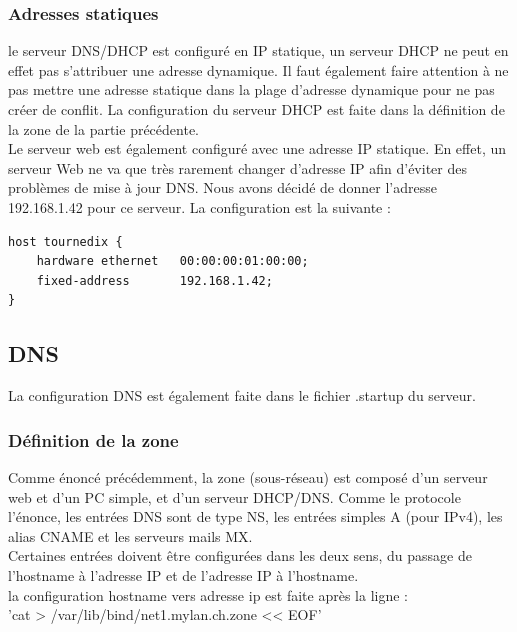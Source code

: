 \documentclass{article}
\begin{document}
\subsubsection{Adresses statiques}

le serveur DNS/DHCP est configuré en IP statique, un serveur DHCP ne peut en effet pas s'attribuer une adresse dynamique. Il faut également faire attention à ne pas mettre une adresse statique dans la plage d'adresse dynamique pour ne pas créer de conflit. La configuration du serveur DHCP est faite dans la définition de la zone de la partie précédente.\\

Le serveur web est également configuré avec une adresse IP statique. En effet, un serveur Web ne va que très rarement changer d'adresse IP afin d'éviter des problèmes de mise à jour DNS. Nous avons décidé de donner l'adresse 192.168.1.42 pour ce serveur. La configuration est la suivante : \\

\begin{lstlisting}
host tournedix {
	hardware ethernet	00:00:00:01:00:00;
	fixed-address		192.168.1.42;
}
\end{lstlisting}

\subsection{DNS}

La configuration DNS est également faite dans le fichier .startup du serveur.

\subsubsection{Définition de la zone}

Comme énoncé précédemment, la zone (sous-réseau) est composé d'un serveur web et d'un PC simple, et d'un serveur DHCP/DNS. Comme le protocole l'énonce, les entrées DNS sont de type NS, les entrées simples A (pour IPv4), les alias CNAME et les serveurs mails MX. \cite{cours}\\

Certaines entrées doivent être configurées dans les deux sens, du passage de l'hostname à l'adresse IP et de l'adresse IP à l'hostname.\\

la configuration hostname vers adresse ip est faite après la ligne : \\
'cat > /var/lib/bind/net1.mylan.ch.zone << EOF' \\
\end{document}
